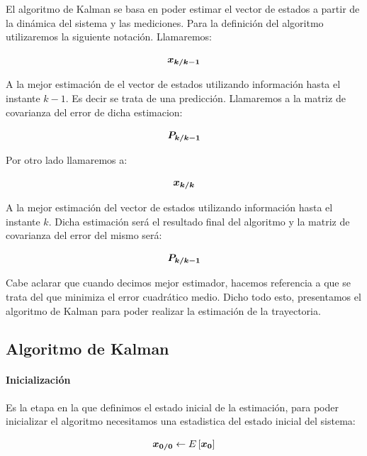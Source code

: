
	El algoritmo de Kalman se basa en poder estimar el vector de estados a partir de la dinámica del sistema y las mediciones. Para la definición del algoritmo utilizaremos la siguiente notación. Llamaremos:
	
	\begin{equation*}
		\boldsymbol{x_{k/k - 1}}
	\end{equation*}
	
	A la mejor estimación de el vector de estados utilizando información hasta el instante $k - 1$. Es decir se trata de una predicción. Llamaremos a la matriz de covarianza del error de dicha estimacion:
	
	\begin{equation*}
		\boldsymbol{P_{k/k - 1}}
	\end{equation*}
	
	Por otro lado llamaremos a:
	
	\begin{equation*}
		\boldsymbol{x_{k/k}}
	\end{equation*}
	
	A la mejor estimación del vector de estados utilizando información hasta el instante $k$. Dicha estimación será el resultado final del algoritmo y la matriz de covarianza del error del mismo será:
	
	\begin{equation*}
		\boldsymbol{P_{k/k - 1}}
	\end{equation*}

	Cabe aclarar que cuando decimos mejor estimador, hacemos referencia a que se trata del que minimiza el error cuadrático medio. Dicho todo esto, presentamos el algoritmo de Kalman para poder realizar la estimación de la trayectoria.
	
		\subsection{Algoritmo de Kalman}
			\paragraph{Inicialización}
				Es la etapa en la que definimos el estado inicial de la estimación, para poder inicializar el algoritmo necesitamos una estadistica del estado inicial del sistema:
				
				\begin{equation*}
					\boldsymbol{x_{0/0}} \leftarrow E\left[\boldsymbol{x_{0}}\right]
				\end{equation*}
				
